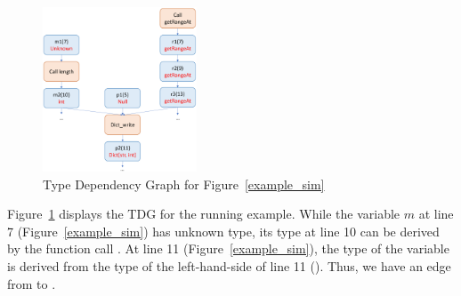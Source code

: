 

\begin{figure}[t]
	\begin{center}
	  \includegraphics[width=1.8in]{figures/type-dep-graph}
          \vspace{-8pt}
		\caption{Type Dependency Graph for Figure~\ref{example_sim}}
		\label{tdg}
	\end{center}
\end{figure}

Figure~\ref{tdg} displays the TDG for the running example. While the
variable $m$ at line 7 (Figure~\ref{example_sim}) has unknown type,
its type at line 10 can be derived by the function call
. At line 11 (Figure~\ref{example_sim}), the type of the
variable  is derived from the type of the left-hand-side of
line 11 (). Thus, we have an edge from 
to .
